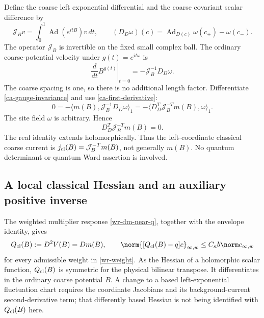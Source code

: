 Define the coarse left exponential differential and the
coarse covariant scalar difference by
\begin{equation}\label{ca-left-differential}
 \mathcal J_Bv=\int_0^1\operatorname{Ad}(e^{itB})v\,dt,
 \qquad
 (D_D\omega)(c)=\operatorname{Ad}_{D(c)}\omega(c_+)-\omega(c_-).
\end{equation}
The operator $\mathcal J_B$ is invertible on the fixed small
complex ball. The ordinary coarse-potential velocity under
$g(t)=e^{it\omega}$ is
\begin{equation}\label{ca-gauge-velocity}
 \left.\frac{d}{dt}B^{g(t)}\right|_{t=0}
             =-\mathcal J_B^{-1}D_D\omega.
\end{equation}
The coarse spacing is one, so there is no additional length
factor. Differentiate \eqref{ca-gauge-invariance} and use
\eqref{ca-first-derivative}:
\[
 0=-\langle m(B),\mathcal J_B^{-1}D_D\omega\rangle_1
   =-\langle D_D^T\mathcal J_B^{-T}m(B),\omega\rangle_1.
\]
The site field $\omega$ is arbitrary. Hence
\begin{equation}\label{ca-ward}
 \boxed{\qquad D_D^T\mathcal J_B^{-T}m(B)=0.\qquad}
\end{equation}
The real identity extends holomorphically. Thus the
left-coordinate classical coarse current is
$j_{\rm cl}(B)=\mathcal J_B^{-T}m(B)$, not generally $m(B)$.
No quantum determinant or quantum Ward assertion is involved.

\subsection{A local classical Hessian and an auxiliary positive inverse}
\label{ca-precision-section}

The weighted multiplier response \eqref{wr-dm-near-q}, together
with the envelope identity, gives
\begin{equation}\label{ca-hessian-weighted}
 Q_{\rm cl}(B):=D^2V(B)=Dm(B),\qquad
 \norm{[Q_{\rm cl}(B)-q]c}_{\infty,w}
       \le C_\kappa b\norm c_{\infty,w}
\end{equation}
for every admissible weight in \eqref{wr-weight}. As the
Hessian of a holomorphic scalar function, $Q_{\rm cl}(B)$
is symmetric for the physical bilinear transpose.
It differentiates in the ordinary coarse potential $B$.
A change to a based left-exponential fluctuation chart
requires the coordinate Jacobians and its background-current
second-derivative term; that differently based Hessian is
not being identified with $Q_{\rm cl}(B)$ here.

